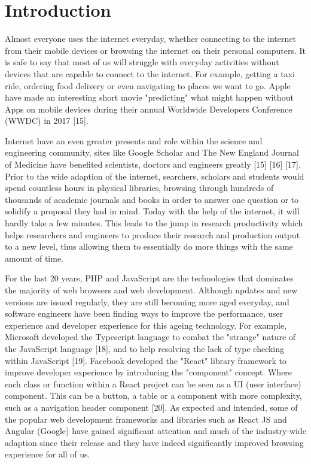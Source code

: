 \chapter{Introduction}

Almost everyone uses the internet everyday, whether connecting to the internet from their mobile devices or browsing the internet on their personal computers. It is safe to say that most of us will struggle with everyday activities without devices that are capable to connect to the internet. For example, getting a taxi ride, ordering food delivery or even navigating to places we want to go. Apple have made an interesting short movie "predicting" what might happen without Apps on mobile devices during their annual Worldwide Developers Conference (WWDC) in 2017 [15].
 
Internet have an even greater presents and role within the science and engineering community, sites like Google Scholar and The New England Journal of Medicine have benefited scientists, doctors and engineers greatly [15] [16] [17]. Prior to the wide adaption of the internet, searchers, scholars and students would spend countless hours in physical libraries, browsing through hundreds of thousands of academic journals and books in order to answer one question or to solidify a proposal they had in mind. Today with the help of the internet, it will hardly take a few minutes. This leads to the jump in research productivity which helps researchers and engineers to produce their research and production output to a new level, thus allowing them to essentially do more things with the same amount of time.
 
For the last 20 years, PHP and JavaScript are the technologies that dominates the majority of web browsers and web development. Although updates and new versions are issued regularly, they are still becoming more aged everyday, and software engineers have been finding ways to improve the performance, user experience and developer experience for this ageing technology. For example, Microsoft developed the Typescript language to combat the "strange" nature of the JavaScript language [18], and to help resolving the lack of type checking within JavaScript [19]. Facebook developed the "React" library framework to improve developer experience by introducing the "component" concept. Where each class or function within a React project can be seen as a UI (user interface) component. This can be a button, a table or a component with more complexity, such as a navigation header component [20]. As expected and intended, some of the popular web development frameworks and libraries such as React JS and Angular (Google) have gained significant attention and much of the industry-wide adaption since their release and they have indeed significantly improved browsing experience for all of us.
 
